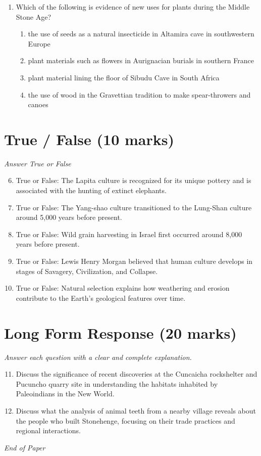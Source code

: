 \documentclass[12pt]{article}
\begin{document}
\begin{enumerate}[label=\arabic*.]
\begin{enumerate}[label=(\alph*)]
    \item Mit'a
    \item Split inheritance
    \item Capacocha
\end{enumerate}
\item Which of the following is evidence of new uses for plants during the Middle Stone Age?
\begin{enumerate}[label=(\alph*)]
    \item the use of seeds as a natural insecticide in Altamira cave in southwestern Europe
    \item plant materials such as flowers in Aurignacian burials in southern France
    \item plant material lining the floor of Sibudu Cave in South Africa
    \item the use of wood in the Gravettian tradition to make spear-throwers and canoes
\end{enumerate}
\end{enumerate}

\section*{True / False (10 marks)}
\textit{Answer True or False}
\begin{enumerate}[label=\arabic*.]
\setcounter{enumi}{5}
\item True or False: The Lapita culture is recognized for its unique pottery and is associated with the hunting of extinct elephants.
\item True or False: The Yang-shao culture transitioned to the Lung-Shan culture around 5,000 years before present.
\item True or False: Wild grain harvesting in Israel first occurred around 8,000 years before present.
\item True or False: Lewis Henry Morgan believed that human culture develops in stages of Savagery, Civilization, and Collapse.
\item True or False: Natural selection explains how weathering and erosion contribute to the Earth's geological features over time.
\end{enumerate}

\section*{Long Form Response (20 marks)}
\textit{Answer each question with a clear and complete explanation.}
\begin{enumerate}[label=\arabic*.]
\setcounter{enumi}{10}
\item Discuss the significance of recent discoveries at the Cuncaicha rockshelter and Pucuncho quarry site in understanding the habitats inhabited by Paleoindians in the New World.
\item Discuss what the analysis of animal teeth from a nearby village reveals about the people who built Stonehenge, focusing on their trade practices and regional interactions.
\end{enumerate}

\vfill
\noindent\textit{End of Paper}
\end{document}
